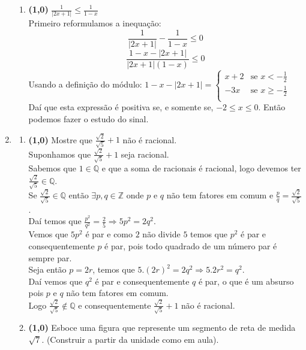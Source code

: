 \documentclass[a4paper,12pt]{article}
\newcommand{\ds}{\displaystyle}
\begin{document}
\begin{enumerate}
\begin{enumerate}
\item {\bf (1,0)} $\ds \frac{1}{|2x+1|}\leq  \frac{1}{1-x}$\\
Primeiro reformulamos a inequação:
 $$\frac{1}{|2x+1|} - \frac{1}{1-x} \leq 0$$
 $$\frac{1-x - |2x+1|}{|2x+1|(1-x)} \leq 0$$
Usando a definição do módulo: $ 1-x - |2x+1| =  \left\{
\begin{array}{ll}
      x+2 & \mbox{se }  x < -\frac{1}{2} \\
      -3x & \mbox{se } x \geq -\frac{1}{2} \\
\end{array} 
 \right.$ Daí que esta expressão é positiva se, e somente se, $-2 \leq x \leq 0$. Então podemos fazer o estudo do sinal.\\
\end{enumerate}	
\vspace{5mm}
\item	
	\begin{enumerate}
	\item {\bf (1,0)} Mostre que $\ds\frac{\sqrt{2}}{\sqrt{5}}+1$ não é racional.\\ 
	\vspace{3mm}
	Suponhamos que $\frac{\sqrt{2}}{\sqrt{5}}+1$ seja racional.\\
 Sabemos que $1\in\mathbb{Q}$ e que a soma de racionais é racional, logo devemos ter $\frac{\sqrt{2}}{\sqrt{5}}\in\mathbb{Q}$.\\
 Se $\frac{\sqrt{2}}{\sqrt{5}}\in\mathbb{Q}$ então $\exists p,q\in\mathbb{Z}$ onde $p$ e $q$ não tem fatores em comum e $\frac{p}{q}=\frac{\sqrt{2}}{\sqrt{5}}$.\\
 Daí temos que $\frac{p^2}{q^2}=\frac{2}{5}\Rightarrow5p^2=2q^2$.\\
 Vemos que $5p^2$ é par e como $2$ não divide $5$ temos que $p^2$ é par e consequentemente $p$ é par, pois todo quadrado de um número par é sempre par.\\
 Seja então $p=2r$, temos que $5.(2r)^2=2q^2\Rightarrow5.2r^2=q^2$.\\
 Daí vemos que $q^2$ é par e consequentemente $q$ é par, o que é um absurso pois $p$ e $q$ não tem fatores em comum.\\
 Logo $\frac{\sqrt{2}}{\sqrt{5}}\not\in\mathbb{Q}$ e consequentemente $\frac{\sqrt{2}}{\sqrt{5}}+1$ não é racional.
	\item {\bf (1,0)} Esboce uma figura que represente um segmento de reta de medida $\sqrt{7}$. (Construir a partir da unidade como em aula). 
	\end{enumerate}
	

\end{enumerate}
\end{document}

